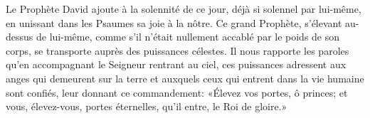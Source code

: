 Le Prophète David ajoute à la solennité de ce jour,
	déjà si solennel par lui-même,
	en unissant dans les Psaumes sa joie à la nôtre.
Ce grand Prophète, s’élevant au-dessus de lui-même,
	comme s’il n’était nullement accablé par le poids de son corps,
	se transporte auprès des puissances célestes.
Il nous rapporte les paroles qu’en accompagnant le Seigneur rentrant au ciel,
	ces puissances adressent aux anges qui demeurent sur la terre
	et auxquels ceux qui entrent dans la vie humaine sont confiés,
	leur donnant ce commandement:
	«Élevez vos portes, ô princes;
	et vous, élevez-vous, portes éternelles,
	qu’il entre, le Roi de gloire.»
